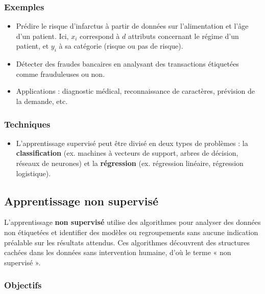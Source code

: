 \documentclass[a4paper,12pt]{report}
\begin{document}
        \subsubsection*{Exemples}
        
        \begin{itemize}
            \item  Prédire le risque d’infarctus à partir de données sur l’alimentation et l’âge d’un patient. Ici, \(x_i\) correspond à \(d\) attributs concernant le régime d’un patient, et \(y_i\) à sa catégorie (risque ou pas de risque).
            \item  Détecter des fraudes bancaires en analysant des transactions étiquetées comme frauduleuses ou non.
            \item  Applications : diagnostic médical, reconnaissance de caractères, prévision de la demande, etc.
        \end{itemize}
        
        \subsubsection*{Techniques}
        
        \begin{itemize}
            \item L'apprentissage supervisé peut être divisé en deux types de problèmes : la \textbf{classification} (ex. machines à vecteurs de support, arbres de décision, réseaux de neurones) et la \textbf{régression} (ex. régression linéaire, régression logistique).
        \end{itemize}
        
        \subsection{Apprentissage non supervisé}
        
        L'apprentissage \textbf{non supervisé} utilise des algorithmes pour analyser des données non étiquetées et identifier des modèles ou regroupements sans aucune indication préalable sur les résultats attendus. Ces algorithmes découvrent des structures cachées dans les données sans intervention humaine, d'où le terme « non supervisé ».
        
        \subsubsection*{Objectifs}
        
\end{document}
